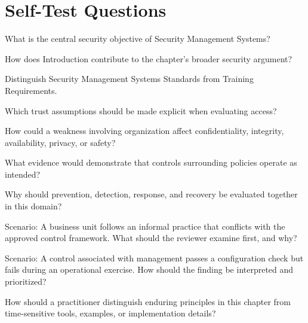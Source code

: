 \documentclass[11pt,letterpaper]{article}
\begin{document}
\section*{Self-Test Questions}
\begin{CornellRecallList}
\item What is the central security objective of Security Management Systems?
\item How does Introduction contribute to the chapter's broader security argument?
\item Distinguish Security Management Systems Standards from Training Requirements.
\item Which trust assumptions should be made explicit when evaluating access?
\item How could a weakness involving organization affect confidentiality, integrity, availability, privacy, or safety?
\item What evidence would demonstrate that controls surrounding policies operate as intended?
\item Why should prevention, detection, response, and recovery be evaluated together in this domain?
\item Scenario: A business unit follows an informal practice that conflicts with the approved control framework. What should the reviewer examine first, and why?
\item Scenario: A control associated with management passes a configuration check but fails during an operational exercise. How should the finding be interpreted and prioritized?
\item How should a practitioner distinguish enduring principles in this chapter from time-sensitive tools, examples, or implementation details?
\end{CornellRecallList}
\end{document}
